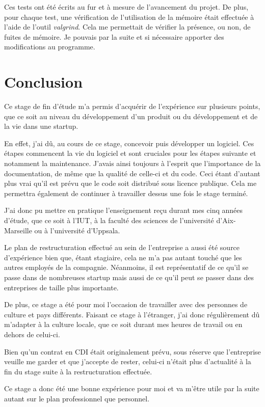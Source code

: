 \documentclass[a4paper,10pt, twoside]{report}
\begin{document}
\begin{spacing}{1.2}
Ces tests ont été écrits au fur et à mesure de l'avancement du projet.
De plus, pour chaque test, une vérification de l'utilisation de la mémoire
était effectuée à l'aide de l'outil \textit{valgrind}. Cela me permettait
de vérifier la présence, ou non, de fuites de mémoire. Je pouvais par la
suite et si nécessaire apporter des modifications au programme.

\chapter{Conclusion}
Ce stage de fin d'étude m'a permis d'acquérir de l'expérience sur
plusieurs points, que ce soit au niveau du développement d'un produit ou du
développement et de la vie dans une startup.

En effet, j'ai dû, au cours de ce stage, concevoir puis développer un
logiciel. Ces étapes commencent la vie du logiciel et sont cruciales pour les
étapes suivante et notamment la maintenance. J'avais ainsi toujours à
l'esprit que l'importance de la documentation, de même que la qualité de
celle-ci et du code. Ceci étant d'autant plus vrai qu'il est prévu que le
code soit distribué sous licence publique. Cela me permettra également de
continuer à travailler dessus une fois le stage terminé.

J'ai donc pu mettre en pratique l'enseignement reçu durant mes cinq années
d'étude, que ce soit à l'IUT, à la faculté des sciences de
l'université d'Aix-Marseille ou à l'université d'Uppsala.

Le plan de restructuration effectué au sein de l'entreprise a aussi été
source d'expérience bien que, étant stagiaire, cela ne m'a pas autant
touché que les autres employés de la compagnie. Néanmoins, il est
représentatif de ce qu'il se passe dans de nombreuses startup mais aussi de
ce qu'il peut se passer dans des entreprises de taille plus importante.

De plus, ce stage a été pour moi l'occasion de travailler avec des personnes
de culture et pays différents. Faisant ce stage à l'étranger, j'ai donc
régulièrement dû m'adapter à la culture locale, que ce soit durant mes
heures de travail ou en dehors de celui-ci.

Bien qu'un contrat en CDI était originalement prévu, sous réserve que
l'entreprise veuille me garder et que j'accepte de rester, celui-ci n'était
plus d'actualité à la fin du stage suite à la restructuration effectuée.

Ce stage a donc été une bonne expérience pour moi et va m'être utile par
la suite autant sur le plan professionnel que personnel.


\end{spacing}
\end{document}
